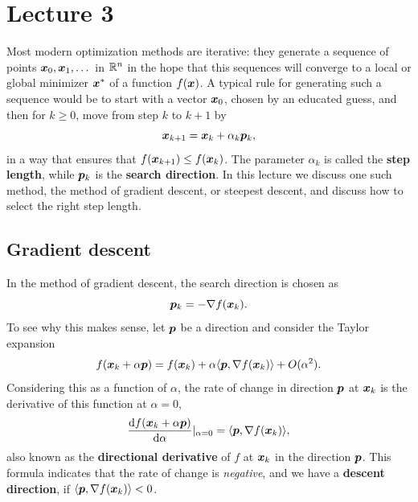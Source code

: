 %
%
% 


\chapter*{Lecture 3}
\addtocounter{chapter}{3}

Most modern optimization methods are iterative: they generate a sequence of points $\bm{x}_0,\bm{x}_1,\dots$ in $\mathbb{R}^n$
in the hope that this sequences will converge to a local or global minimizer $\bm{x}^*$ of a function $f(\bm{x})$. A typical rule for generating such a sequence would be to start with a vector $\bm{x}_0$, chosen by an educated guess, and then for $k\geq 0$, move from step $k$ to $k+1$ by
\begin{equation*}
 \bm{x}_{k+1} = \bm{x}_k+\alpha_k\bm{p}_k,
\end{equation*}
in a way that ensures that $f(\bm{x}_{k+1})\leq f(\bm{x}_k)$.
The parameter $\alpha_k$ is called the \textbf{step length}, while $\bm{p}_k$ is the \textbf{search direction}. In this lecture we discuss one such method, the method of gradient descent, or steepest descent, and discuss how to select the right step length.

\section{Gradient descent} 
In the method of gradient descent, the search direction is chosen as
\begin{equation}\label{eq:gradient}
 \bm{p}_k = -\nabla f(\bm{x}_k).
\end{equation}
To see why this makes sense, let $\bm{p}$ be a direction and consider the Taylor expansion
\begin{equation*}
 f(\bm{x}_k+\alpha \bm{p}) = f(\bm{x}_k)+\alpha \langle {\bm{p}}, {\nabla f(\bm{x}_k)} \rangle+O(\alpha^2).
\end{equation*}
Considering this as a function of $\alpha$, the rate of change in direction $\bm{p}$ at $\bm{x}_k$ is the derivative of this function at $\alpha=0$,
\begin{equation*}
 \frac{\mathrm{d}{f}(\bm{x}_k+\alpha \bm{p})}{\mathrm{d}{\alpha}}|_{\alpha=0} = \langle {\bm{p}}, {\nabla f(\bm{x}_k)} \rangle,
\end{equation*}
also known as the \textbf{directional derivative} of $f$ at $\bm{x}_k$ in the direction $\bm{p}$.
This formula indicates that the rate of change is {\em negative}, and we have a \textbf{descent direction}, if $\langle {\bm{p}}, {\nabla f(\bm{x}_k)} \rangle<0$. 

